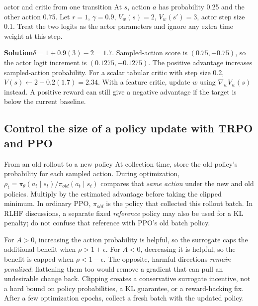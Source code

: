 \documentclass[10pt,a4paper]{article}
\newcommand{\ans}{\par\smallskip\textbf{\color{good}Solution\quad}}
\begin{document}
\begin{question}{actor and critic from one transition}
At $s$, action $a$ has probability 0.25 and the other action 0.75. Let $r=1$, $\gamma=0.9$, $V_w(s)=2$, $V_w(s')=3$, actor step size 0.1. Treat the two logits as the actor parameters and ignore any extra time weight at this step.
\ans $\delta=1+0.9(3)-2=1.7$. Sampled-action score is $(0.75,-0.75)$, so the actor logit increment is $(0.1275,-0.1275)$. The positive advantage increases sampled-action probability. For a scalar tabular critic with step size 0.2, $V(s)\leftarrow2+0.2(1.7)=2.34$. With a feature critic, update $w$ using $\nabla_wV_w(s)$ instead. A positive reward can still give a negative advantage if the target is below the current baseline.
\end{question}

\subsection{Control the size of a policy update with TRPO and PPO}
\begin{card}{From an old rollout to a new policy}
At collection time, store the old policy's probability for each sampled action. During optimization, $\rho_t=\pi_\theta(a_t\mid s_t)/\pi_{old}(a_t\mid s_t)$ compares that \emph{same action} under the new and old policies. Multiply by the estimated advantage before taking the clipped minimum.
In ordinary PPO, $\pi_{old}$ is the policy that collected this rollout batch. In RLHF discussions, a separate fixed \emph{reference} policy may also be used for a KL penalty; do not confuse that reference with PPO's old batch policy.

For $A>0$, increasing the action probability is helpful, so the surrogate caps the additional benefit when $\rho>1+\epsilon$. For $A<0$, decreasing it is helpful, so the benefit is capped when $\rho<1-\epsilon$. The opposite, harmful directions \emph{remain penalized}: flattening them too would remove a gradient that can pull an undesirable change back. Clipping creates a conservative surrogate incentive, not a hard bound on policy probabilities, a KL guarantee, or a reward-hacking fix. After a few optimization epochs, collect a fresh batch with the updated policy.
\end{card}
\end{document}
